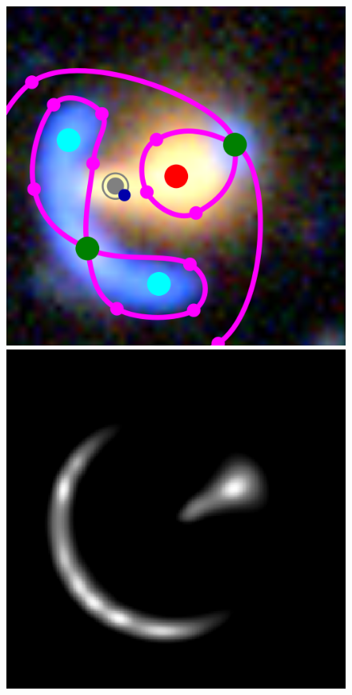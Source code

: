 \documentclass[usenatbib]{mn2e}
\newlength{\myplotswidth}
\begin{document}
\begin{figure}
  \centering

  \includegraphics[width=\myplotswidth]{fig/006990_input}
  \includegraphics[width=\myplotswidth]{fig/006990_arr_time_ipol} \\

\end{figure}
\end{document}
